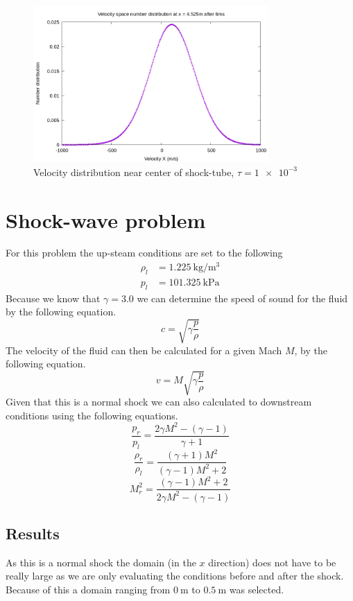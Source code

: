\documentclass[paper=a4, fontsize=12pt]{scrartcl}
\begin{document}
\begin{figure}[H]
        \centering
        \includegraphics[width=0.8\textwidth]{center_shock}
        \caption{Velocity distribution near center of shock-tube, $\tau = \SI{1e-3}{}$}
        \label{fig:center_shock}
\end{figure}


\section{Shock-wave problem}
For this problem the up-steam conditions are set to the following
\begin{align*}
        \rho_l &= \SI{1.225}{\kilogram \per \meter^3}\\
        p_l &= \SI{101.325}{\kilo \pascal}
\end{align*}
Because we know that $\gamma = 3.0$ we can determine the speed of sound for the fluid by the following
equation.
\[
        c= \sqrt{\gamma \frac{p}{\rho}}
\]
The velocity of the fluid can then be calculated for a given Mach $M$, by the following equation.
\[
v = M \sqrt{\gamma \frac{p}{\rho}}
\]
Given that this is a normal shock we can also calculated to downstream conditions using the following
equations.
\[
        \frac{p_r}{p_l} = \frac{2 \gamma M^2 - (\gamma-1)}{\gamma+1}
\]
\[
        \frac{\rho_r}{\rho_l} = \frac{(\gamma+1)M^2}{(\gamma-1)M^2 +2}
\]
\[
        M_r^2= \frac{(\gamma -1)M^2 +2}{2\gamma M^2-(\gamma-1)}
\]
\subsection{Results}
As this is a normal shock the domain (in the $x$ direction) does not have to be really large as we are only
evaluating the conditions before and after the shock.
Because of this a domain ranging from $\SI{0}{\meter}$ to $\SI{0.5}{\meter}$ was selected.
\end{document}
